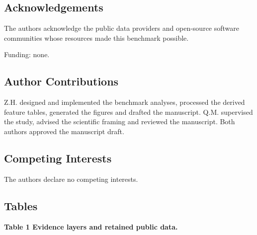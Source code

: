 \documentclass[
  10pt,
]{article}
\newcounter{none} %
\begin{document}
\subsection{Acknowledgements}\label{acknowledgements}

The authors acknowledge the public data providers and open-source
software communities whose resources made this benchmark possible.

Funding: none.

\subsection{Author Contributions}\label{author-contributions}

Z.H. designed and implemented the benchmark analyses, processed the
derived feature tables, generated the figures and drafted the
manuscript. Q.M. supervised the study, advised the scientific framing
and reviewed the manuscript. Both authors approved the manuscript draft.

\subsection{Competing Interests}\label{competing-interests}

The authors declare no competing interests.

\subsection{Tables}\label{tables}

\textbf{Table 1 \textbar{} Evidence layers and retained public data.}
\end{document}
